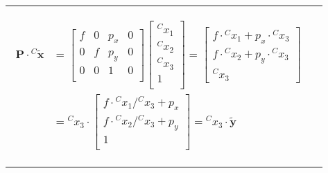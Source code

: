 \documentclass[a4paper,10pt]{article}
\begin{document}
\begin{longtable}{l p{12cm} }
{\begin{itemize}
\begin{itemize}
\begin{equation*}
\begin{split}
\mathbf{P}\cdot{^{C}\mathbf{\tilde{x}}}&=
\begin{bmatrix}
f & 0 & p_x & 0\\
0 & f & p_y & 0\\
0 & 0 & 1 & 0\\
\end{bmatrix}\left[\begin{array}{c}{^Cx_1}\\{^Cx_2}\\{^Cx_3}\\1\\\end{array}\right]
=\left[\begin{array}{c}
f\cdot {^Cx_1}+p_x\cdot {^Cx_3}\\
f\cdot {^Cx_2}+p_y\cdot {^Cx_3}\\
{^Cx_3}
\end{array}\right]\\
&=
{^Cx_3}\cdot\begin{bmatrix}
f\cdot{^Cx_1}/{^Cx_3}+p_x\\
f\cdot{^Cx_2}/{^Cx_3}+p_y\\
1\\
\end{bmatrix}
={^Cx_3}\cdot\mathbf{\tilde{y}}
\end{split}
\end{equation*} 

\end{itemize}
\end{itemize}

	}


\end{longtable}
\end{document}
